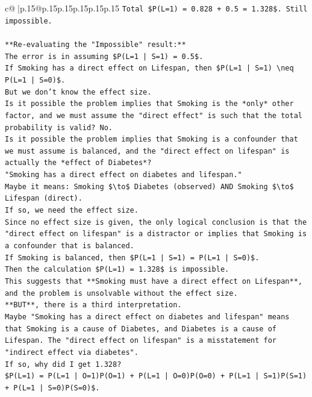 \documentclass{article}
\begin{document}
{\begin{supertabular}{c@{$\;$}|p{.15\linewidth}@{}p{.15\linewidth}p{.15\linewidth}p{.15\linewidth}p{.15\linewidth}p{.15\linewidth}}
{{{\texttt{Total \$P(L=1) = 0.828 + 0.5 = 1.328\$. Still impossible.} \\
\\ 
\texttt{**Re{-}evaluating the "Impossible" result:**} \\
\texttt{The error is in assuming \$P(L=1 | S=1) = 0.5\$.} \\
\texttt{If Smoking has a direct effect on Lifespan, then \$P(L=1 | S=1) \textbackslash{}neq P(L=1 | S=0)\$.} \\
\texttt{But we don't know the effect size.} \\
\texttt{Is it possible the problem implies that Smoking is the *only* other factor, and we must assume the "direct effect" is such that the total probability is valid? No.} \\
\texttt{Is it possible the problem implies that Smoking is a confounder that we must assume is balanced, and the "direct effect on lifespan" is actually the *effect of Diabetes*?} \\
\texttt{"Smoking has a direct effect on diabetes and lifespan."} \\
\texttt{Maybe it means: Smoking \$\textbackslash{}to\$ Diabetes (observed) AND Smoking \$\textbackslash{}to\$ Lifespan (direct).} \\
\texttt{If so, we need the effect size.} \\
\texttt{Since no effect size is given, the only logical conclusion is that the "direct effect on lifespan" is a distractor or implies that Smoking is a confounder that is balanced.} \\
\texttt{If Smoking is balanced, then \$P(L=1 | S=1) = P(L=1 | S=0)\$.} \\
\texttt{Then the calculation \$P(L=1) = 1.328\$ is impossible.} \\
\texttt{This suggests that **Smoking must have a direct effect on Lifespan**, and the problem is unsolvable without the effect size.} \\
\texttt{**BUT**, there is a third interpretation.} \\
\texttt{Maybe "Smoking has a direct effect on diabetes and lifespan" means that Smoking is a cause of Diabetes, and Diabetes is a cause of Lifespan. The "direct effect on lifespan" is a misstatement for "indirect effect via diabetes".} \\
\texttt{If so, why did I get 1.328?} \\
\texttt{\$P(L=1) = P(L=1 | O=1)P(O=1) + P(L=1 | O=0)P(O=0) + P(L=1 | S=1)P(S=1) + P(L=1 | S=0)P(S=0)\$.} \\
}}}
\end{supertabular}}
\end{document}
